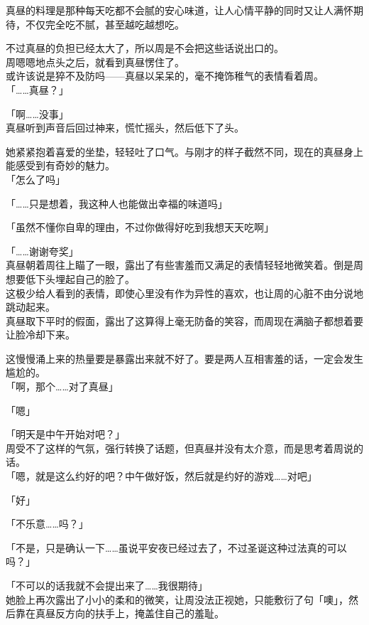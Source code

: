 真昼的料理是那种每天吃都不会腻的安心味道，让人心情平静的同时又让人满怀期待，不仅完全吃不腻，甚至越吃越想吃。

不过真昼的负担已经太大了，所以周是不会把这些话说出口的。\\

周嗯嗯地点头之后，就看到真昼愣住了。\\

或许该说是猝不及防吗——真昼以呆呆的，毫不掩饰稚气的表情看着周。\\

「……真昼？」

「啊……没事」\\

真昼听到声音后回过神来，慌忙摇头，然后低下了头。

她紧紧抱着喜爱的坐垫，轻轻吐了口气。与刚才的样子截然不同，现在的真昼身上能感受到有奇妙的魅力。\\

「怎么了吗」

「……只是想着，我这种人也能做出幸福的味道吗」

「虽然不懂你自卑的理由，不过你做得好吃到我想天天吃啊」

「……谢谢夸奖」\\

真昼朝着周往上瞄了一眼，露出了有些害羞而又满足的表情轻轻地微笑着。倒是周想要低下头埋起自己的脸了。\\

这极少给人看到的表情，即使心里没有作为异性的喜欢，也让周的心脏不由分说地跳动起来。\\

真昼取下平时的假面，露出了这算得上毫无防备的笑容，而周现在满脑子都想着要让脸冷却下来。

这慢慢涌上来的热量要是暴露出来就不好了。要是两人互相害羞的话，一定会发生尴尬的。\\

「啊，那个……对了真昼」

「嗯」

「明天是中午开始对吧？」\\

周受不了这样的气氛，强行转换了话题，但真昼并没有太介意，而是思考着周说的话。\\

「嗯，就是这么约好的吧？中午做好饭，然后就是约好的游戏……对吧」

「好」

「不乐意……吗？」

「不是，只是确认一下……虽说平安夜已经过去了，不过圣诞这种过法真的可以吗？」

「不可以的话我就不会提出来了……我很期待」\\

她脸上再次露出了小小的柔和的微笑，让周没法正视她，只能敷衍了句「噢」，然后靠在真昼反方向的扶手上，掩盖住自己的羞耻。
